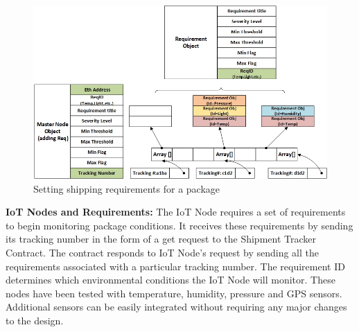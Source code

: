 \begin{figure}[h]
	\centering
    \includegraphics[width=170mm,scale=1]{figs/requirement-impl}
	\caption{Setting shipping requirements for a package}
	\label{fig:requirement-impl} 
\end{figure}

\textbf{IoT Nodes and Requirements:} 
The IoT Node requires a set of requirements to begin monitoring package conditions. It receives these requirements by sending its tracking number in the form of a get request to the Shipment Tracker Contract. The contract responds to IoT Node’s request by sending all the requirements associated with a particular tracking number. The requirement ID determines which environmental conditions the IoT Node will monitor. These nodes have been tested with temperature, humidity, pressure and GPS sensors. Additional sensors can be easily integrated without requiring any major changes to the design. %
\vspace{0.2cm}
